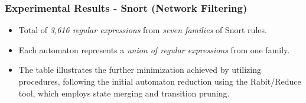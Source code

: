 \begin{frame}
  \frametitle{Experimental Results - Snort (Network Filtering)}
    \begin{itemize}
      \item Total of \emph{3,616 regular expressions} from \emph{seven families} of Snort rules.
      \item Each automaton represents a \emph{union of regular expressions} from one family.
      \item The table illustrates the further minimization achieved by utilizing procedures, following the initial automaton reduction using the Rabit/Reduce tool, which employs state merging and transition pruning.\justifying
    \end{itemize}


    \vspace*{0.8em}


\end{frame}
